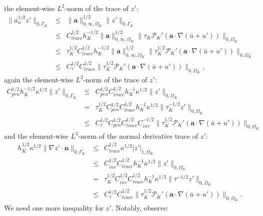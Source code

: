 \documentclass[11pt]{article}
\newenvironment{proof}[1][Proof]{\begin{trivlist}
\item[\hskip \labelsep {\bfseries #1}]}{\end{trivlist}}
\begin{document}
\begin{proof}
\begin{eqnarray}
\end{eqnarray}
the element-wise $L^2$-norm of the trace of $z'$:
\begin{eqnarray}
\| a^{1/2}_n z'\|_{0,\Gamma_K} &\leq&\| \bm{a} \|^{1/2}_{0,\infty,\Omega_K} \| z' \|_{0,\Gamma_K} \nonumber \\
&\leq& C^{1/2}_{trace} h_K^{-1/2} \| \bm{a} \|^{1/2}_{0,\infty,\Omega_K} \| \tau_K \mathcal{P}_K' \left( \bm{a} \cdot \nabla \left( \bar{u} + u' \right) \right) \|_{0,\Omega_K} \nonumber \\
&\leq& \tau^{1/2}_K C^{1/2}_{trace} h_K^{-1/2} \| \bm{a} \|^{1/2}_{0,\infty,\Omega_K} \| \tau^{1/2}_K \mathcal{P}_K' \left( \bm{a} \cdot \nabla \left( \bar{u} + u' \right) \right) \|_{0,\Omega_K} \nonumber \\
&\leq& C^{1/2}_{\tau} C^{1/2}_{trace} \| \tau^{1/2}_K \mathcal{P}_K' \left( \bm{a} \cdot \nabla \left( \bar{u} + u' \right) \right) \|_{0,\Omega_K},
\end{eqnarray}
again the element-wise $L^2$-norm of the trace of $z'$:
\begin{eqnarray}
C^{1/2}_{pen} h_K^{-1/2} \kappa^{1/2} \| z' \|_{0,\Gamma_K} &\leq& C^{1/2}_{pen} C^{1/2}_{trace} h_K^{-1} \kappa^{1/2} \| z' \|_{0,\Omega_K} \nonumber \\
&=& \tau_K^{1/2} C^{1/2}_{pen} C^{1/2}_{trace} h_K^{-1} \kappa^{1/2} \| \tau^{-1/2}_K z' \|_{0,\Omega_K} \nonumber \\
&\leq& C^{1/2}_{\tau} C^{1/2}_{pen} C^{1/2}_{trace} C^{-1/2}_{inv} \| \tau^{1/2}_K \mathcal{P}_K' \left( \bm{a} \cdot \nabla \left( \bar{u} + u' \right) \right) \|_{0,\Omega_K}
\end{eqnarray}
and the element-wise $L^2$-norm of the normal derivative trace of $z'$:
\begin{eqnarray}
h_K^{1/2} \kappa^{1/2} \| \nabla z' \cdot \bm{n} \|_{0,\Gamma_K} &\leq& C^{1/2}_{trace} \kappa^{1/2} | z' |_{1,\Omega_K} \nonumber \\
&\leq&  C^{1/2}_{inv} C^{1/2}_{trace} h_K^{-1} \kappa^{1/2} \| z' \|_{0,\Omega_K} \nonumber \\
&=& \tau_K^{1/2} C^{1/2}_{inv} C^{1/2}_{trace} h_K^{-1} \kappa^{1/2} \| \tau^{-1/2} z' \|_{0,\Omega_K} \nonumber \\
&\leq& C^{1/2}_{\tau} C^{1/2}_{trace} \| \tau^{1/2}_K \mathcal{P}_K' \left( \bm{a} \cdot \nabla \left( \bar{u} + u' \right) \right) \|_{0,\Omega_K}.
\end{eqnarray}
We need one more inequality for $z'$.  Notably, observe:
\begin{eqnarray}

\end{eqnarray}
\end{proof}
\end{document}
